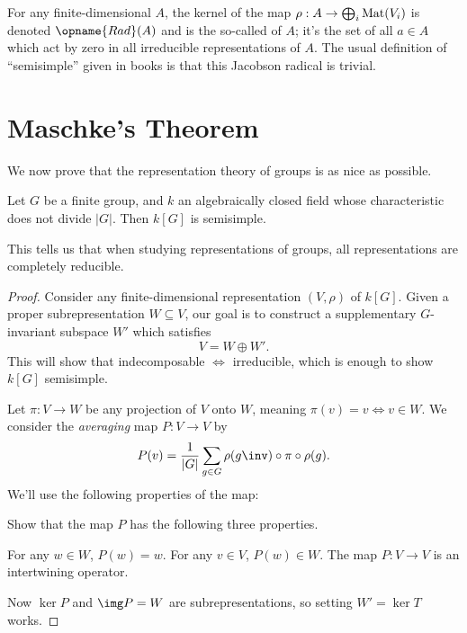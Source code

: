 \begin{remark}
	[Digression]
	For any finite-dimensional $A$, the kernel of the map
	$\rho : A \to \bigoplus_i \mathrm{Mat}(V_i)$ is denoted $\opname{Rad}(A)$
	and is the so-called  of $A$;
	it's the set of all $a \in A$ which act by zero in all irreducible representations of $A$.
	The usual definition of ``semisimple'' given in books is that
	this Jacobson radical is trivial.
\end{remark}

\section{Maschke's Theorem}
We now prove that the representation theory of groups is as nice as possible.
\begin{theorem}
	Let $G$ be a finite group, and $k$ an algebraically closed
	field whose characteristic does not divide $|G|$.
	Then $k[G]$ is semisimple.
\end{theorem}
This tells us that when studying representations of groups,
all representations are completely reducible.
\begin{proof}
	Consider any finite-dimensional representation $(V, \rho)$ of $k[G]$.
	Given a proper subrepresentation $W \subseteq V$,
	our goal is to construct a supplementary $G$-invariant subspace $W'$
	which satisfies \[ V = W \oplus W'. \]
	This will show that indecomposable $\iff$ irreducible,
	which is enough to show $k[G]$ semisimple.

	Let $\pi : V \to W$ be any projection of $V$ onto $W$,
	meaning $\pi(v) = v \iff v \in W$.
	We consider the \emph{averaging} map $P : V \to V$ by
	\[ 
		P(v) = \frac{1}{\left\lvert G \right\rvert}
		\sum_{g \in G} \rho(g\inv) \circ \pi \circ \rho(g).
	\]
	We'll use the following properties of the map:
	\begin{exercise}
		Show that the map $P$ has the following three properties.
		\begin{itemize}
			\ii For any $w \in W$, $P(w) = w$.
			\ii For any $v \in V$, $P(w) \in W$.
			\ii The map $P : V \to V$ is an intertwining operator.
		\end{itemize}
	\end{exercise}
	Now $\ker P$ and $\img P = W$ are subrepresentations,
	so setting $W' = \ker T$ works.
\end{proof}


